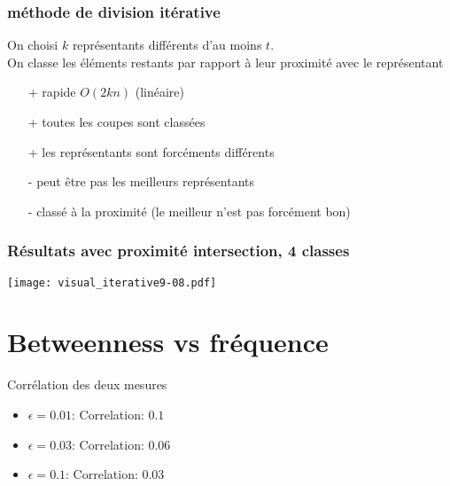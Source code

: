 \documentclass[aspectratio=169]{beamer}
\begin{document}
    \begin{frame}
        \frametitle{méthode de division itérative}
        On choisi $k$ représentants différents d'au moins $t$.\\
        On classe les éléments restants par rapport à leur proximité avec le représentant
        \begin{itemize}
            \item[+] rapide $O(2kn)$ (linéaire)
            \item[+] toutes les coupes sont classées
            \item[+] les représentants sont forcéments différents 
            \item[-] peut être pas les meilleurs représentants 
            \item[-] classé à la proximité (le meilleur n'est pas forcément bon) 
        \end{itemize}
    \end{frame} 

    \begin{frame}
        \frametitle{Résultats avec proximité intersection, 4 classes}
    
        \texttt{[image: visual\_iterative9-08.pdf]}
    
    \end{frame}

    
    \section{Betweenness vs fréquence}

    \begin{frame}{Corrélation des deux mesures}
    \begin{itemize}
        \item $\epsilon = 0.01$: Correlation: $0.1$
        \item $\epsilon = 0.03$: Correlation: $0.06$
        \item $\epsilon = 0.1$:  Correlation: $0.03$
    \end{itemize}
    \end{frame}
\end{document}
